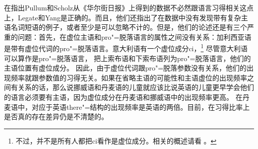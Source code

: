 在指出Pullum和Scholz从《华尔街日报》上得到的数据不必然跟语言习得相关这点上，Legate和Yang是正确的。而且，他们还指出了在数据中没有发现带有复杂主语名词短语的例子，或者至少是可以忽略不计的。但是，他们的论述还是有三个严重的问题：首先，在虚位主语和pro"=脱落语言的属性之间没有关系：加利西亚语 \citep[\S~2.5]{RU90a-u}是带有虚位代词的pro"=脱落语言。意大利语有一个虚位成分ci，\footnote{%
不过，并不是所有人都把ci看作是虚位成分。相关的概述请看 。
} 尽管意大利语可以算作是pro"=脱落语言， \citet{Franks95a-u}把上索布语和下索布语列为pro"=脱落语言，他们的主语位置有虚位成分。
因此，由于虚位代词跟pro"=脱落参数没有关系，他们的出现频率就跟参数值的习得无关。如果在省略主语的可能性和主语虚位的出现频率之间有关系的话，那么说挪威语和丹麦语的儿童就应该比说英语的儿童更早学会他们的语言必须要有主语，因为虚位成分在丹麦语和挪威语中的出现频率更高\citep[]{SP2002b}。
在丹麦语中，对应于英语there"=结构的出现频率是英语的两倍。目前，在习得比率上是否真的存在差异仍是不清楚的\citep[]{Pullum2009a}。

